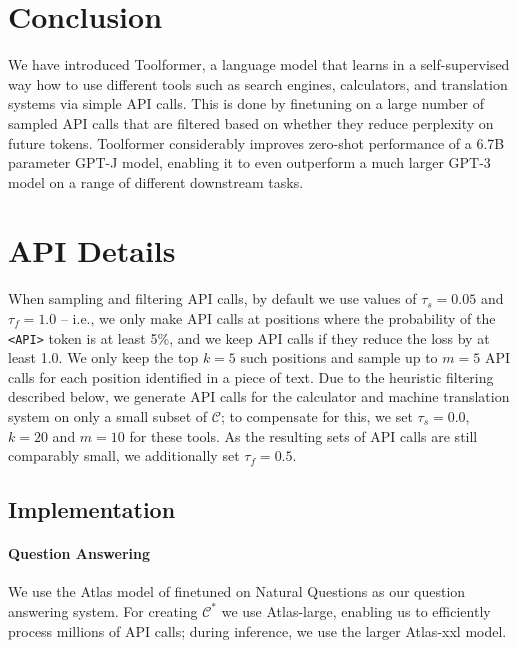 \documentclass[11pt]{article}
\newcommand{\ours}[0]{Toolformer}
\begin{document}
\begin{CJK*}{UTF8}{gbsn}
\section{Conclusion}

We have introduced \ours{}, a language model that learns in a self-supervised way how to use different tools such as search engines, calculators, and translation systems via simple API calls. This is done by finetuning on a large number of sampled API calls that are filtered based on whether they reduce perplexity on future tokens. \ours{} considerably improves zero-shot performance of a 6.7B parameter GPT-J model, enabling it to even outperform a much larger GPT-3 model on a range of different downstream tasks.




\clearpage
\appendix

\section{API Details}
\label{appendix:api-details}

When sampling and filtering API calls, by default we use values of $\tau_s = 0.05$ and $\tau_f = 1.0$ -- i.e., we only make API calls at positions where the probability of the \texttt{<API>} token is at least 5\%, and we keep API calls if they reduce the loss by at least 1.0. We only keep the top $k = 5$ such positions and sample up to $m = 5$ API calls for each position identified in a piece of text. Due to the heuristic filtering described below, we generate API calls for the calculator and machine translation system on only a small subset of $\mathcal{C}$; to compensate for this, we set $\tau_s = 0.0$, $k = 20$ and $m = 10$ for these tools. As the resulting sets of API calls are still comparably small, we additionally set $\tau_f = 0.5$.

\subsection{Implementation}

\paragraph{Question Answering} We use the Atlas model of \citet{izacard2022atlas} finetuned on Natural Questions \citep{kwiatkowski-etal-2019-natural} as our question answering system. For creating $\mathcal{C}^*$ we use Atlas-large, enabling us to efficiently process millions of API calls; during inference, we use the larger Atlas-xxl model.


\end{CJK*}
\end{document}
